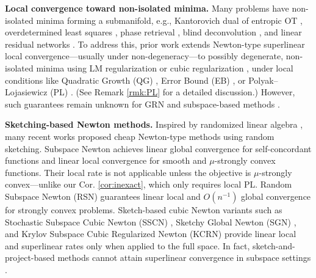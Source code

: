 \documentclass[11pt]{amsart}
\theoremstyle{plain}
\theoremstyle{definition}
\theoremstyle{remark}
\def\param{\boldsymbol{\theta}}
\begin{document}
\noindent\textbf{Local convergence toward non-isolated minima.}
Many problems have non-isolated minima forming a submanifold, e.g., Kantorovich dual of entropic OT \cite{cuturi2013sinkhorn}, overdetermined least squares \cite{gentle2012numerical}, phase retrieval \cite{zhou2016geometrical}, blind deconvolution \cite{li2019rapid}, and linear residual networks \cite{hardt2016identity}. To address this, prior work extends Newton-type superlinear local convergence—usually under non-degeneracy—to possibly degenerate, non-isolated minima using LM regularization \cite{yamashita2001rate, fan2005quadratic, li2004regularized, fischer2024levenberg} or cubic regularization \cite{nesterov2006cubic,yue2019quadratic, rebjock2024fast}{, under local conditions like Quadratic Growth (QG) \cite{bonnans1995second}, Error Bound (EB) \cite{luo1993error}, or Polyak–Lojasiewicz (PL) \cite{polyak1963gradient}. (See Remark \ref{rmk:PL} for a detailed discussion.)} However, such guarantees remain unknown for GRN \cite{mishchenko2023regularized} and subspace-based methods \cite{pilanci2017newton, gower2019rsn, jiang2024krylov, hanzely2020stochastic, hanzely2023sketch}.

\noindent \textbf{Sketching-based Newton methods.}
Inspired by randomized linear algebra \cite{gower2017randomized}, many recent works proposed cheap Newton-type methods using random sketching.
Subspace Newton \cite{pilanci2017newton} achieves linear global convergence for self-concordant functions and linear local convergence for smooth and $\mu$-strongly convex functions. Their local rate is not applicable unless the objective is $\mu$-strongly convex—unlike our Cor. \ref{cor:inexact}, which only requires local PL.
Random Subspace Newton (RSN) \cite{gower2019rsn} guarantees linear local and $O(n^{-1})$ global convergence for strongly convex problems. Sketch-based cubic Newton variants such as Stochastic Subspace Cubic Newton (SSCN) \cite{hanzely2020stochastic}, Sketchy Global Newton (SGN) \cite{hanzely2023sketch}, and Krylov Subspace Cubic Regularized Newton (KCRN) \cite{jiang2024krylov} provide linear local and superlinear rates only when applied to the full space. In fact, sketch-and-project-based methods cannot attain superlinear convergence in subspace settings \cite{jiang2024krylov, hanzely2020stochastic, hanzely2023sketch}.
\end{document}

